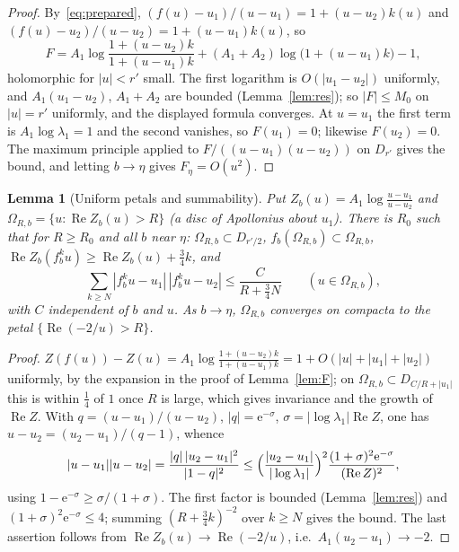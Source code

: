 \documentclass[11pt]{amsart}
\newtheorem{lemma}[theorem]{Lemma}
\theoremstyle{definition}
\newcommand{\eee}{\mathrm{e}}
\begin{document}
\begin{proof}
By~\eqref{eq:prepared}, $(f(u)-u_1)/(u-u_1)=1+(u-u_2)k(u)$ and
$(f(u)-u_2)/(u-u_2)=1+(u-u_1)k(u)$, so
\[
 F=A_1\log\frac{1+(u-u_2)k}{1+(u-u_1)k}+(A_1+A_2)\log\bigl(1+(u-u_1)k\bigr)-1,
\]
holomorphic for $|u|<r'$ small.  The first logarithm is $O(|u_1-u_2|)$
uniformly, and $A_1(u_1-u_2)$, $A_1+A_2$ are bounded (Lemma~\ref{lem:res}); so
$|F|\le M_0$ on $|u|=r'$ uniformly, and the displayed formula converges.  At
$u=u_1$ the first term is $A_1\log\lambda_1=1$ and the second vanishes, so
$F(u_1)=0$; likewise $F(u_2)=0$.  The maximum principle applied to
$F/((u-u_1)(u-u_2))$ on $D_{r'}$ gives the bound, and letting $b\to\eta$ gives
$F_\eta=O(u^2)$.
\end{proof}

\begin{lemma}[Uniform petals and summability]\label{lem:petal}
Put $Z_b(u)=A_1\log\frac{u-u_1}{u-u_2}$ and
$\Omega_{R,b}=\{u:\operatorname{Re}Z_b(u)>R\}$ (a disc of Apollonius about
$u_1$).  There is $R_0$ such that for $R\ge R_0$ and all $b$ near $\eta$:
$\Omega_{R,b}\subset D_{r'/2}$, $f_b(\Omega_{R,b})\subset\Omega_{R,b}$,
$\operatorname{Re}Z_b(f_b^ku)\ge\operatorname{Re}Z_b(u)+\tfrac34k$, and
\[
 \sum_{k\ge N}|f_b^ku-u_1|\,|f_b^ku-u_2|\le\frac{C}{R+\tfrac34N}
 \qquad(u\in\Omega_{R,b}),
\]
with $C$ independent of $b$ and $u$.  As $b\to\eta$, $\Omega_{R,b}$ converges on
compacta to the petal $\{\operatorname{Re}(-2/u)>R\}$.
\end{lemma}

\begin{proof}
$Z(f(u))-Z(u)=A_1\log\frac{1+(u-u_2)k}{1+(u-u_1)k}=1+O(|u|+|u_1|+|u_2|)$
uniformly, by the expansion in the proof of Lemma~\ref{lem:F}; on
$\Omega_{R,b}\subset D_{C/R+|u_1|}$ this is within $\tfrac14$ of $1$ once $R$ is large,
which gives invariance and the growth of $\operatorname{Re}Z$.  With
$q=(u-u_1)/(u-u_2)$, $|q|=\eee^{-\sigma}$, $\sigma=|\log\lambda_1|\operatorname{Re}Z$,
one has $u-u_2=(u_2-u_1)/(q-1)$, whence
\[
 |u-u_1||u-u_2|=\frac{|q|\,|u_2-u_1|^2}{|1-q|^2}
 \le\Bigl(\frac{|u_2-u_1|}{|\log\lambda_1|}\Bigr)^2
 \frac{(1+\sigma)^2\eee^{-\sigma}}{(\operatorname{Re}Z)^2},
\]
using $1-\eee^{-\sigma}\ge\sigma/(1+\sigma)$.  The first factor is bounded
(Lemma~\ref{lem:res}) and $(1+\sigma)^2\eee^{-\sigma}\le4$; summing
$(R+\tfrac34k)^{-2}$ over $k\ge N$ gives the bound.  The last assertion follows
from $\operatorname{Re}Z_b(u)\to\operatorname{Re}(-2/u)$, i.e.\
$A_1(u_2-u_1)\to-2$.
\end{proof}
\end{document}
